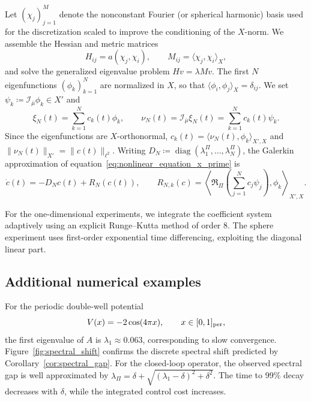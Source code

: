 \documentclass[11pt]{article}
\numberwithin{equation}{section}
\theoremstyle{definition}
\newcommand{\rieszmap}[1][\mu]{\mathcal{I}_{#1}}
\begin{document}
Let $(\chi_j)_{j=1}^M$ denote the nonconstant Fourier (or spherical harmonic) basis used for the discretization scaled to improve the conditioning of the $X$-norm.
We assemble the Hessian and metric matrices
\begin{equation}
    \label{eq:discrete-hessian-matrices}
    H_{ij} = a(\chi_j, \chi_i), \qquad M_{ij}= \langle\chi_j, \chi_i\rangle_X,
\end{equation}
and solve the generalized eigenvalue problem $Hv = \lambda Mv$.
The first $N$ eigenfunctions $(\phi_k)_{k=1}^N$ are normalized in $X$, so that $\langle \phi_i, \phi_j \rangle_X = \delta_{ij}$.
We set $\psi_k \coloneqq \rieszmap[\bar\mu]\phi_k \in X'$ and
\[
\xi_N(t) = \sum_{k=1}^N c_k(t) \phi_k, \qquad \nu_N(t) = \rieszmap[\bar\mu]\xi_N(t) = \sum_{k=1}^N c_k(t) \psi_k.
\]
Since the eigenfunctions are $X$-orthonormal, $c_k(t) = \langle\nu_N(t), \phi_k\rangle_{X',X}$ and $\|\nu_N(t)\|_{X'} = \|c(t)\|_{\ell^2}$.
Writing $D_N \coloneqq \operatorname{diag}(\lambda_1^\Pi, \ldots, \lambda_N^\Pi)$, the Galerkin approximation of equation~\eqref{eq:nonlinear_equation_x_prime} is
\begin{equation}
    \label{eq:closed-loop-galerkin-system}
    \dot{c}(t) = -D_N c(t) + R_N(c(t)), \qquad R_{N,k}(c) = \left\langle \mathfrak{R}_\Pi\left(\sum_{j=1}^N c_j \psi_j\right), \phi_k \right\rangle_{X',X}.
\end{equation}

For the one-dimensional experiments, we integrate the coefficient
system adaptively using an explicit Runge--Kutta method of order $8$. 
The sphere experiment uses first-order exponential
time differencing, exploiting the diagonal linear part.

\subsection{Additional numerical examples}
\label{app:sec:standard-models}

For the periodic double-well potential
\[
V(x) = -2\cos(4\pi x), \qquad x \in [0,1]_{\rm per},
\]
the first eigenvalue of $A$ is $\lambda_1 \approx 0.063$, corresponding to slow convergence.
Figure~\ref{fig:spectral_shift} confirms the discrete spectral shift predicted by Corollary~\ref{cor:spectral_gap}.
For the closed-loop operator, the observed spectral gap is well approximated by $\lambda_\Pi = \delta + \sqrt{(\lambda_1-\delta)^2 + \delta^2}$.
The time to 99\% decay decreases with $\delta$, while the integrated control cost increases.
\end{document}
